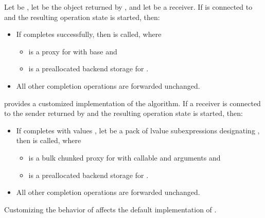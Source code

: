 \pnum
Let  be ,
let  be the object returned by , and
let  be a receiver.
If  is connected to  and
the resulting operation state is started, then:
\begin{itemize}
\item
If  completes successfully,
then  is called, where
\begin{itemize}
\item
{} is a proxy for 
with base  and
\item
{} is a preallocated backend storage for .
\end{itemize}
\item
All other completion operations are forwarded unchanged.
\end{itemize}

\pnum
{} provides a customized implementation of
the  algorithm.
If a receiver  is connected to the sender
returned by  and
the resulting operation state is started, then:
\begin{itemize}
\item
If  completes with values ,
let  be a pack of lvalue subexpressions designating ,
then  is called, where
\begin{itemize}
\item
{} is a bulk chunked proxy for 
with callable  and arguments  and
\item
{} is a preallocated backend storage for .
\end{itemize}
\item
All other completion operations are forwarded unchanged.
\end{itemize}
\begin{note}
Customizing the behavior of 
affects the default implementation of .
\end{note}

